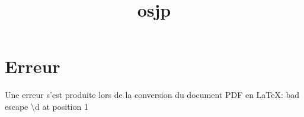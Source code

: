 \documentclass[12pt]{article}
\title{osjp}
\author{}
\date{}
\begin{document}
\maketitle
\tableofcontents
\newpage

\section{Erreur}
Une erreur s'est produite lors de la conversion du document PDF en LaTeX: bad escape \textbackslash{}d at position 1
\end{document}
